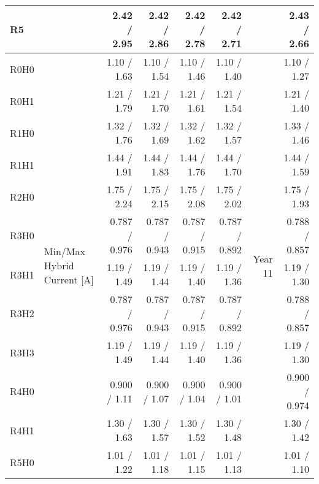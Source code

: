 \begin{table}[ht]
\begin{centering}
{\begin{tabular}{|l|l|r|r|r|r|r|r|}
R5                              &                                              &   2.42 / 2.95 &   2.42 / 2.86 &   2.42 / 2.78 &   2.42 / 2.71 &  &   2.43 / 2.66 \\ \hline
R0H0                            & \multirow{13}{*}{Min/Max Hybrid Current [A]} &   1.10 / 1.63 &   1.10 / 1.54 &   1.10 / 1.46 &   1.10 / 1.40 & \multirow{13}{*}{Year 11} &   1.10 / 1.27 \\ 
R0H1                            &                                              &   1.21 / 1.79 &   1.21 / 1.70 &   1.21 / 1.61 &   1.21 / 1.54 &  &   1.21 / 1.40 \\ 
R1H0                            &                                              &   1.32 / 1.76 &   1.32 / 1.69 &   1.32 / 1.62 &   1.32 / 1.57 &  &   1.33 / 1.46 \\ 
R1H1                            &                                              &   1.44 / 1.91 &   1.44 / 1.83 &   1.44 / 1.76 &   1.44 / 1.70 &  &   1.44 / 1.59 \\ 
R2H0                            &                                              &   1.75 / 2.24 &   1.75 / 2.15 &   1.75 / 2.08 &   1.75 / 2.02 &  &   1.75 / 1.93 \\ 
R3H0                            &                                              & 0.787 / 0.976 & 0.787 / 0.943 & 0.787 / 0.915 & 0.787 / 0.892 &  & 0.788 / 0.857 \\ 
R3H1                            &                                              &   1.19 / 1.49 &   1.19 / 1.44 &   1.19 / 1.40 &   1.19 / 1.36 &  &   1.19 / 1.30 \\ 
R3H2                            &                                              & 0.787 / 0.976 & 0.787 / 0.943 & 0.787 / 0.915 & 0.787 / 0.892 &  & 0.788 / 0.857 \\ 
R3H3                            &                                              &   1.19 / 1.49 &   1.19 / 1.44 &   1.19 / 1.40 &   1.19 / 1.36 &  &   1.19 / 1.30 \\ 
R4H0                            &                                              &  0.900 / 1.11 &  0.900 / 1.07 &  0.900 / 1.04 &  0.900 / 1.01 &  & 0.900 / 0.974 \\ 
R4H1                            &                                              &   1.30 / 1.63 &   1.30 / 1.57 &   1.30 / 1.52 &   1.30 / 1.48 &  &   1.30 / 1.42 \\ 
R5H0                            &                                              &   1.01 / 1.22 &   1.01 / 1.18 &   1.01 / 1.15 &   1.01 / 1.13 &  &   1.01 / 1.10 \\ 

\end{tabular}}
\end{centering}
\end{table}
